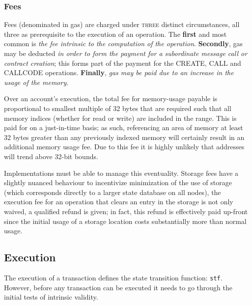 \documentclass[10pt,a4paper,leqno,bibliography=totoc]{scrartcl}
\newenvironment{alphafootnotes}
{\par\edef\savedfootnotenumber{\number\value{footnote}}
\renewcommand{\thefootnote}{\alph{footnote}}
\setcounter{footnote}{0}}
{\par\setcounter{footnote}{\savedfootnotenumber}}
\begin{document}
\begin{alphafootnotes}
\begin{multicols*}{2}
			\subsubsection{Fees} Fees (denominated in gas) are charged under \textsc{three} distinct circumstances, all three as prerequisite to the execution of an operation.\supercite{Wood2017} The \textbf{first} and most common is \textsl{the fee intrinsic to the computation of the operation}. \textbf{Secondly}, gas may be deducted \textsl{in order to form the payment for a subordinate message call or contract creation}; this forms part of the payment for the CREATE, CALL and CALLCODE operations. \textbf{Finally}, \textsl{gas may be paid due to an increase in the usage of the memory.} 


			Over an account’s execution, the total fee for memory-usage payable is proportional to smallest multiple of 32 bytes that are required such that all memory indices (whether for read or write) are included in the range. This is paid for on a just-in-time basis; as such, referencing an area of memory at least 32 bytes greater than any previously indexed memory will certainly result in an additional memory usage fee. Due to this fee it is highly unlikely that addresses will trend above 32-bit bounds.\supercite{Wood2017} 
					
			Implementations must be able to manage this eventuality. Storage fees have a slightly nuanced behaviour to incentivize minimization of the use of storage (which corresponds directly to a larger state database on all nodes), the execution fee for an operation that clears an entry in the storage is not only waived, a qualified refund is given; in fact, this refund is effectively paid up-front since the initial usage of a storage location costs substantially more than normal usage. \supercite{Wood2017}
					
			\subsection{Execution}
				The execution of a transaction defines the state transition function: \texttt{stf}. However, before any transaction can be executed it needs to go through the initial tests of intrinsic validity.

\end{multicols*}
\end{alphafootnotes}
\end{document}
